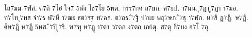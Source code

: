 {โส7มม
7ฬส.
ต7ถิ
7โฮ
ใจ7
5ฟง
ไช7โย
5พต.
กรร7กศ
ล7บก.
ศ7ยป.
า7นน.
ุ7ฎา
ู7ฏา
า7มอ.
ท7โท
ุ7ทส
จ่า7ร
ฬ7หี
า7ฒะ
ธต7รฐ
ท7คล.
ต7ถร.
ิ7ฐิ
ป7ผะ
พฤ7ษภ.
ิ7ธุ
า7ฬก.
ห7สิ
ฏ7ฏิ.
ษ7ฏิ.
ศิษ7ฎิ
ษ7ฏี
5ษส.
ิ7ปิ
ู7ริ.
ฑ7ฑุ
ษ7ฏุ
า7ตา
ว7ตก
ง7ตก
เก6ตุ.
ส7ตุ
ลิ7บง
ฮ7โ
7อุ.
}
